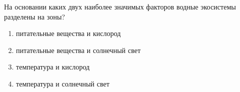 
На основании каких двух наиболее значимых
факторов водные экосистемы разделены на зоны?

\begin{enumerate}
    \item питательные вещества и кислород 
    \item питательные вещества и солнечный свет
    \item температура и кислород 
    \item температура и солнечный свет
\end{enumerate}

\explanationSection

